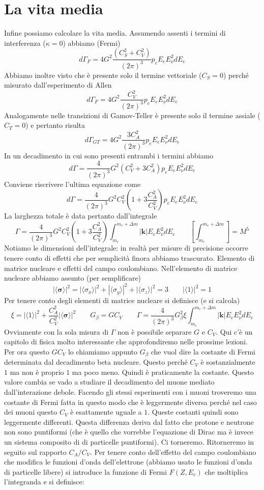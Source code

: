 \section{La vita media}
Infine possiamo calcolare la vita media. Assumendo assenti i termini di interferenza ($\kappa=0$) abbiamo (Fermi)
$$
d\Gamma_F = 4G^2 \frac{(C_S^2 + C_V^2)}{(2\pi)^3} p_e E_e E_\nu^2 dE_e
$$
Abbiamo inoltre visto che è presente solo il termine vettoriale ($C_S=0$) perché misurato dall'esperimento di Allen
$$
d\Gamma_F = 4G^2 \frac{C_V^2}{(2\pi)^3} p_e E_e E_\nu^2 dE_e
$$
Analogamente nelle transizioni di Gamov-Teller è presente solo il termine assiale ($C_T=0$) e pertanto risulta
$$
d\Gamma_{GT} = 4G^2 \frac{3C_A^2}{(2\pi)^3} p_e E_e E_\nu^2 dE_e
$$
In un decadimento in cui sono presenti entrambi i termini abbiamo
$$
d\Gamma = \frac{4}{(2\pi)^3} G^2 (C_V^2 + 3C_A^2) p_e E_e E_\nu^2 dE_e
$$
Conviene riscrivere l'ultima equazione come
$$
d\Gamma = \frac{4}{(2\pi)^3} G^2 C_V^2 \left( 1 + 3 \frac{C_A^2}{C_V^2} \right) p_e E_e E_\nu^2 dE_e
$$
La larghezza totale è data pertanto dall'integrale
$$
\Gamma = \frac{4}{(2\pi)^3} G^2 C_V^2 \left( 1 + 3 \frac{C_A^2}{C_V^2} \right) \int_{m_e}^{m_e+\Delta m} |\mathbf{k}| E_e E_\nu^2 dE_e \qquad \left[ \int_{m_e}^{m_e+\Delta m} \right] = M^5
$$
Notiamo le dimensioni dell'integrale: in realtà per misure di precisione occorre tenere conto di effetti che per semplicità finora abbiamo trascurato. Elemento di matrice nucleare e effetti del campo coulombiano. Nell'elemento di matrice nucleare abbiamo assunto (per semplificare)
$$
|\langle \boldsymbol{\sigma} \rangle|^2 = |\langle \sigma_x \rangle|^2 + |\langle \sigma_y \rangle|^2 + |\langle \sigma_z \rangle|^2 = 3 \qquad |\langle 1 \rangle|^2 = 1
$$
Per tenere conto degli elementi di matrice nucleare si definisce (e si calcola)
$$
\xi = |\langle 1 \rangle|^2 + \frac{C_A^2}{C_V^2} |\langle \boldsymbol{\sigma} \rangle|^2 \qquad G_\beta = G C_V\qquad \Gamma = \frac{4}{(2\pi)^3} G_\beta^2 \xi \int_{m_e}^{m_e+\Delta m} |\mathbf{k}| E_e E_\nu^2 dE_e
$$
Ovviamente con la sola misura di $\Gamma$ non è possibile separare $G$ e $C_V$. Qui c'è un capitolo di fisica molto interessante che approfondiremo nelle prossime lezioni. Per ora questo $GC_V$ lo chiamiamo appunto $G_\beta$ che vuol dire la costante di Fermi determinata dal decadimento beta nucleare. Questo perché $C_V$ è sostanzialmente $1$ ma non è proprio $1$ ma poco meno. Quindi è praticamente la costante. Questo valore cambia se vado a studiare il decadimento del muone mediato dall'interazione debole. Facendo gli stessi esperimenti con i muoni troveremo una costante di Fermi fatta in questo modo che è leggermente diversa perché nel caso dei muoni questo $C_V$ è esattamente uguale a $1$. Queste costanti quindi sono leggermente differenti. Questa differenza deriva dal fatto che protone e neutrone non sono puntiformi (che è quello che vorrebbe l'equazione di Dirac ma è invece un sistema composito di di particelle puntiformi). Ci torneremo. Ritorneremo in seguito sul rapporto $C_A/C_V$. Per tenere conto dell'effetto del campo coulombiano che modifica le funzioni d'onda dell'elettrone (abbiamo usato le funzioni d'onda di particelle libere) si introduce la funzione di Fermi $F(Z,E_e)$ che moltiplica l'integranda e si definisce:
